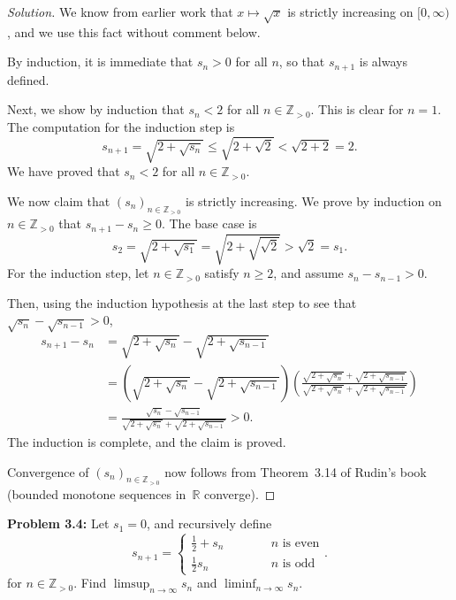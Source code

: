 \documentclass[10pt]{amsart}
\newcommand{\I}{\infty}
\newcommand{\R}{{\mathbb{R}}}
\newcommand{\N}{{\mathbb{Z}}_{> 0}}
\begin{document}
\begin{proof}[Solution]
We know from earlier work that $x \mapsto \sqrt{x}$
is strictly increasing on $[0, \I)$,
and we use this fact without comment below.

By induction, it is immediate that $s_n > 0$ for all $n$, so that
$s_{n + 1}$ is always defined.

Next, we show by induction that $s_n < 2$ for all $n \in \N$.
This is clear for $n = 1$.
The computation for the induction step is
\[
s_{n + 1}
 = \sqrt{2 + \sqrt{s_n}}
 \leq \sqrt{2 + \sqrt{2}}
 < \sqrt{2 + 2}
 = 2.
\]
We have proved that $s_n < 2$ for all $n \in \N$.

We now claim that $(s_n)_{n \in \N}$ is strictly increasing.
We prove by induction on $n \in \N$ that
$s_{n+1} - s_n \geq 0$.
The base case is
\[
s_2
 = \sqrt{2 + \sqrt{s_1}}
 = \sqrt{2 + \sqrt{\sqrt{2}}}
 > \sqrt{2}
 = s_1.
\]
For the induction step,
let $n \in \N$ satisfy $n \geq 2$,
and assume $s_{n} - s_{n - 1} > 0$.

Then,
using the induction hypothesis at the last step
to see that $\sqrt{s_n} - \sqrt{s_{n - 1}} > 0$,
%
\begin{align*}
s_{n+1} - s_n
& = \sqrt{2 + \sqrt{s_n}} - \sqrt{2 + \sqrt{s_{n - 1}}}
\\
& = \left( \sqrt{2 + \sqrt{s_n}} - \sqrt{2 + \sqrt{s_{n - 1}}} \right)
    \left( \frac{\sqrt{2 + \sqrt{s_n}} + \sqrt{2 + \sqrt{s_{n - 1}}}}{
         \sqrt{2 + \sqrt{s_n}} + \sqrt{2 + \sqrt{s_{n - 1}}}} \right)
\\
& = \frac{\sqrt{s_n} - \sqrt{s_{n - 1}}}{\sqrt{2 + \sqrt{s_n}} +
                      \sqrt{2 + \sqrt{s_{n - 1}}}} > 0.
\end{align*}
%
The induction is complete,
and the claim is proved.

Convergence of $(s_n)_{n \in \N}$
now follows from Theorem~3.14
of Rudin's book
(bounded monotone sequences in~$\R$ converge).
\end{proof}

\vspace{2ex}

\noindent
{\textbf{Problem 3.4:}}
Let $s_1 = 0$, and recursively define
\[
s_{n + 1} = \left\{ \begin{array}{ll}
  {\textstyle{\frac{1}{2}}} + s_n & \hspace{3em} \mbox{$n$ is even} \\
  {\textstyle{\frac{1}{2}}} s_n & \hspace{3em} \mbox{$n$ is odd}
                                              \end{array} \right..   %
\]
for $n \in \N$.
Find $\limsup_{n \to \I} s_n$ and $\liminf_{n \to \I} s_n$.
\end{document}
